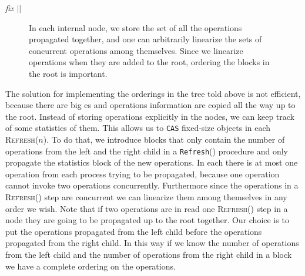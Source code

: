 \documentclass[10pt]{article}
\renewcommand{\it}[1]{\textit{#1}}
\newcommand{\nf}[1]{{\normalfont{\texttt{#1}}}}
\theoremstyle{definition}
\begin{document}
\it{fix $||$}
\begin{figure}[h]
\begin{center}
\caption{\label{fig::set} In each internal node, we store the set of all the operations propagated together, and one can arbitrarily linearize the sets of concurrent operations among themselves. Since we linearize operations when they are added to the root, ordering the blocks in the root is important.}
\end{center}
\end{figure}

The solution for  implementing the orderings in the tree told above is not efficient, because there are big \nf{CAS}es and operations information are copied all the way up to the root.
Instead of storing operations explicitly in the nodes, we can keep track of some statistics of them. This allows us to \texttt{CAS} fixed-size objects in each \textsc{Refresh}($n$). To do that, we introduce blocks that only contain the number of operations from the left and the right child in a \texttt{Refresh}() procedure and only propagate the statistics block of the new operations. In each \nf{Refresh()} there is at most one operation from each process trying to be propagated, because one operation cannot invoke two operations concurrently. Furthermore since the operations in a \textsc{Refresh()} step are concurrent we can linearize them  among themselves in any order we wish. Note that if two operations are in read one \textsc{Refresh()} step in a node they are going to be propagated up to the root together. Our choice is to put the operations propagated from the left child before the operations propagated from the right child. In this way if we know the number of operations from the left child and the number of operations from the right child in a block  we have a complete ordering on the operations.
\end{document}
